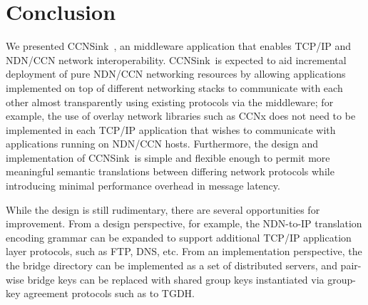 \documentclass{sigcomm}
\newcommand{\sink}{{\sf CCNSink}}
\begin{document}






\section{Conclusion}
We presented \sink\ , an middleware application that enables TCP/IP and NDN/CCN network interoperability. \sink\ is expected to aid incremental deployment of pure NDN/CCN networking resources by allowing applications implemented on top of different networking stacks to communicate with each other almost transparently using existing protocols via the middleware; for example, the use of overlay network libraries such as CCNx does not need to be implemented in each TCP/IP application that wishes to communicate with applications running on NDN/CCN hosts. Furthermore, the design and implementation of \sink\ is simple and flexible enough to permit more meaningful semantic translations between differing network protocols while introducing minimal performance overhead in message latency. 

While the design is still rudimentary, there are several opportunities for improvement. From a design perspective, for example, the NDN-to-IP translation encoding grammar can be expanded to support additional TCP/IP application layer protocols, such as FTP, DNS, etc. From an implementation perspective, the the bridge directory can be implemented as a set of distributed servers, and pair-wise bridge keys can be replaced with shared group keys instantiated via group-key agreement protocols such as to TGDH. 



\end{document}
